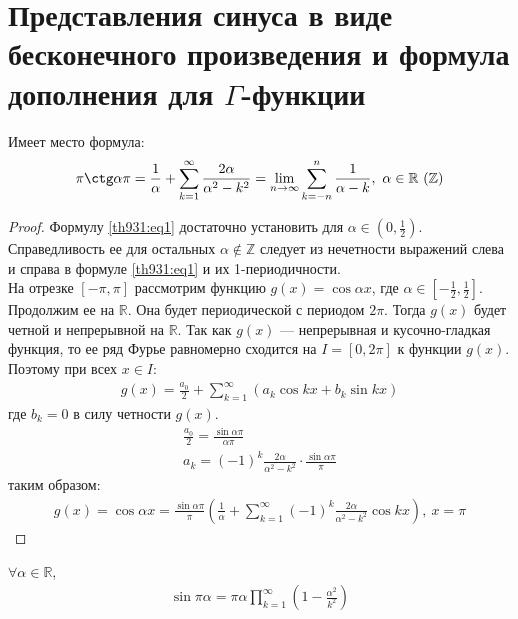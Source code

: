 \section{Представления синуса в виде бесконечного произведения и формула
дополнения для $\Gamma$-функции}
\begin{theorem}
  Имеет место формула:
  \begin{gather}
    \pi \ctg \alpha \pi = \frac{1}{\alpha} + \sum\limits_{k = 1}^{\infty}
    \frac{2\alpha}{\alpha^2 - k^2} = \lim\limits_{n \to \infty} \sum\limits_{k
    = -n}^{n} \frac{1}{\alpha - k}, \ \alpha \in \mathbb{R} \ (\mathbb{Z})
    \label{th931:eq1}
  \end{gather}
\end{theorem}
\begin{proof}
  Формулу \eqref{th931:eq1} достаточно установить для $\alpha \in (0,
  \frac{1}{2})$. Справедливость ее для остальных $\alpha \not\in \mathbb{Z}$ следует из нечетности выражений слева и справа в формуле
  \eqref{th931:eq1} и их 1-периодичности. \\ На отрезке $[-\pi, \pi]$ рассмотрим
  функцию $g(x) = \cos \alpha x$, где $\alpha \in [-\frac{1}{2}, \frac{1}{2}]$.
  Продолжим ее на $\mathbb{R}$. Она будет периодической с периодом $2\pi$.
  Тогда $g(x)$ будет четной и непрерывной на $\mathbb{R}$. Так как $g(x)$ ---
  непрерывная и кусочно-гладкая функция, то ее ряд Фурье равномерно сходится на
  $I = [0, 2\pi]$ к функции $g(x)$. Поэтому при всех $x \in I$:
  \begin{gather*}
    g(x) = \frac{a_0}{2} + \sum\limits_{k = 1}^{\infty} (a_k \cos kx + b_k
    \sin kx)
  \end{gather*}
  где $b_k = 0$ в силу четности $g(x)$.
  \begin{gather*}
    \frac{a_0}{2} = \frac{\sin \alpha \pi}{\alpha \pi} \\
    a_k = (-1)^k \frac{2\alpha}{\alpha^2 - k^2} \cdot \frac{\sin \alpha
    \pi}{\pi}
  \end{gather*}
  таким образом:
  \begin{gather*}
    g(x) = \cos \alpha x = \frac{\sin \alpha \pi}{\pi} \left(\frac{1}{\alpha} +
    \sum\limits_{k = 1}^{\infty} (-1)^k \frac{2\alpha}{\alpha^2 - k^2} \cos kx
    \right), \ x = \pi
  \end{gather*}
\end{proof}

\begin{theorem}[Эйлера]
  $\forall \alpha \in \mathbb{R}$,
  \begin{gather}
    \sin \pi \alpha = \pi \alpha \prod\limits_{k = 1}^\infty \left(1 -
    \frac{\alpha^2}{k^2}\right)
    \label{th932:eq1}
  \end{gather}
\end{theorem}

